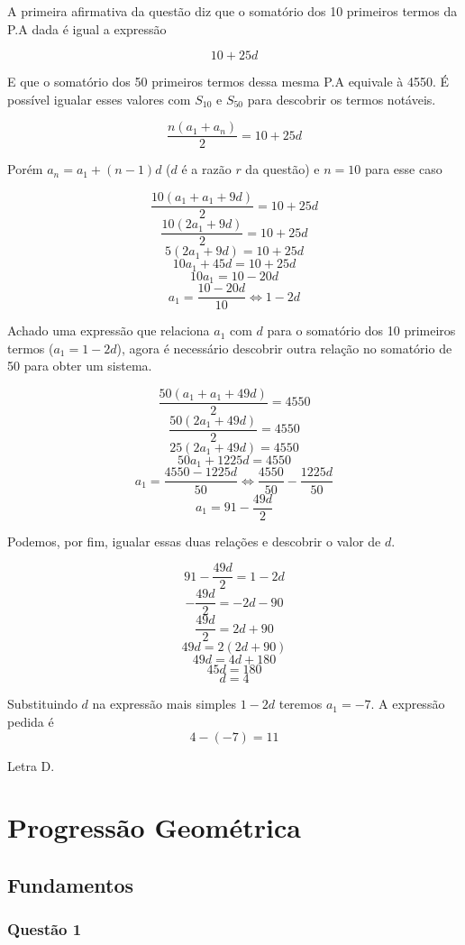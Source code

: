 \hrulefill

A primeira afirmativa da questão diz que o somatório dos 10 primeiros termos da P.A dada é igual a expressão

\[10 + 25d\]

E que o somatório dos 50 primeiros termos dessa mesma P.A equivale à 4550. É possível igualar esses valores com $S_{10}$ e $S_{50}$ para descobrir os termos notáveis.

\[\frac{n(a_{1} + a_{n})}{2} = 10 + 25d\]

Porém $a_{n} = a_{1} + (n - 1)d$ ($d$ é a razão $r$ da questão) e $n = 10$ para esse caso

\[\frac{10(a_{1} + a_{1} + 9d)}{2} = 10 + 25d\]
\[\frac{10(2a_{1} + 9d)}{2} = 10 + 25d\]
\[5(2a_{1} + 9d) = 10 + 25d\]
\[10a_{1} + 45d = 10 + 25d\]
\[10a_{1} = 10 - 20d\]
\[a_{1} = \frac{10 - 20d}{10} \Leftrightarrow 1 - 2d\]

Achado uma expressão que relaciona $a_{1}$ com $d$ para o somatório dos 10 primeiros termos ($a_{1} = 1 - 2d$), agora é necessário descobrir outra relação no somatório de 50 para obter um sistema.

\[\frac{50(a_{1} + a_1 + 49d)}{2} = 4550\]
\[\frac{50(2a_{1} + 49d)}{2} = 4550\]
\[25(2a_{1} + 49d) = 4550\]
\[50a_{1} + 1225d = 4550\]
\[a_{1} = \frac{4550 - 1225d}{50} \Leftrightarrow \frac{4550}{50} - \frac{1225d}{50}\]
\[a_{1} = 91 - \frac{49d}{2}\]

Podemos, por fim, igualar essas duas relações e descobrir o valor de $d$.

\[91 - \frac{49d}{2} = 1 - 2d\]
\[-\frac{49d}{2} = -2d - 90\]
\[\frac{49d}{2} = 2d + 90\]
\[49d = 2(2d + 90)\]
\[49d = 4d + 180\]
\[45d = 180\]
\[d = 4\]

Substituindo $d$ na expressão mais simples $1 - 2d$ teremos $a_{1} = -7$. A expressão pedida é
\[4 - (-7) = 11\]

Letra D.


\section{Progressão Geométrica}

\subsection{Fundamentos}

\subsubsection*{Questão 1}

